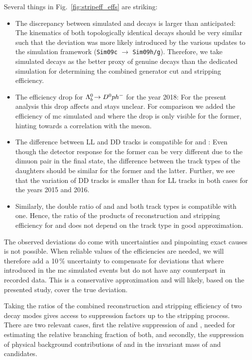 Several things in Fig.~\ref{fig:stripeff_effs} are striking:
\begin{itemize}
    \item The discrepancy between simulated \decay{\Lb}{\Dz\Lz} and \decay{\Xibz}{\Dz\Lz} decays is larger than anticipated: The kinematics of both topologically identical decays should be very similar such that the deviation was more likely introduced by the various updates to the simulation framework (\texttt{Sim09c} $\to$ \texttt{Sim09h/g}). Therefore, we take simulated \decay{\Xibz}{\Dz\Lz} decays as the better proxy of genuine \decay{\Lb}{\Dz\Lz} decays than the dedicated \decay{\Lb}{\Dz\Lz} simulation for determining the combined generator cut and stripping efficiency.
    \item The efficiency drop for ${{\Lambda}^0_{b}}\!\rightarrow {\ensuremath{{D}^0}}{\ensuremath{p}}h^-$ for the year 2018: For the present analysis this drop affects \decay{\Lb}{\Dz\proton\pim} and stays unclear. For comparison we added the efficiency of \gls{mc} simulated \decay{\Lb}{\Dz\proton\Km} and \decay{\Lb}{\Lz\Kp\Km} where the drop is only visible for the former, hinting towards a correlation with the \Dz meson.
    \item The difference between \gls{LL} and \gls{DD} tracks is compatible for \decay{\Lb}{\jpsi\Lz} and \decay{\Lb}{\Lz\Kp\Km}: Even though the detector response for the former can be very different due to the dimuon pair in the final state, the difference between the track types of the \Lz daughters should be similar for the former and the latter. Further, we see that the variation of \gls{DD} tracks is smaller than for \gls{LL} tracks in both cases for the years 2015 and 2016.
    \item Similarly, the double ratio of \decay{\Lb}{\Dz\Lz} and \decay{\Xibz}{\Dz\Lz} and both track types is compatible with one. Hence, the ratio of the products of reconstruction and \gls{stripping} efficiency for \decay{\Lb}{\Dz\Lz} and \decay{\Xibz}{\Dz\Lz} does not depend on the track type in good approximation. 
\end{itemize}
The observed deviations do come with uncertainties and pinpointing exact causes is not possible.
When reliable values of the efficiencies are needed, we will therefore add a 10\,\% uncertainty to compensate for deviations that where introduced in the \gls{mc} simulated events but do not have any counterpart in recorded data.
This is a conservative approximation and will likely, based on the presented study, cover the true deviation.

Taking the ratios of the combined reconstruction and \gls{stripping} efficiency of two \Lb decay modes gives access to suppression factors up to the \gls{stripping} process.
There are two relevant cases, first the relative suppression of \decay{\Lb}{\Dz\proton\pim} and \decay{\Lb}{\Dz\Lz}, needed for estimating the relative branching fraction of both, and secondly, the suppression of physical background contributions of \decay{\Lb}{\Dz\proton\pim} and \decay{\Lb}{\Lz\Kp\Km} in the invariant mass of \Dz and \Lz candidates.


